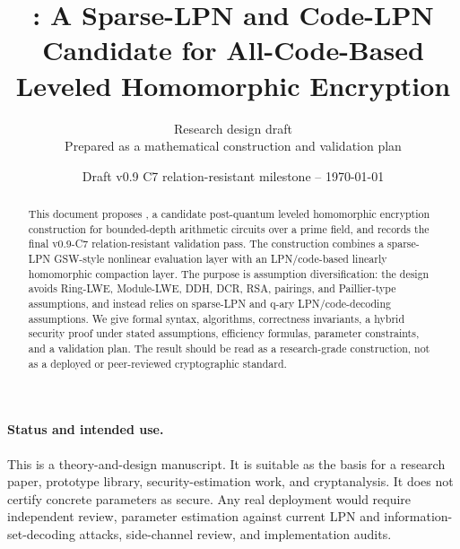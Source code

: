 \documentclass[11pt]{article}
\title{\sable: A Sparse-LPN and Code-LPN Candidate for All-Code-Based Leveled Homomorphic Encryption}
\author{Research design draft\\Prepared as a mathematical construction and validation plan}
\date{Draft v0.9 C7 relation-resistant milestone -- \today}
\begin{document}
\maketitle

\begin{abstract}
This document proposes \sable, a candidate post-quantum leveled homomorphic encryption construction for bounded-depth arithmetic circuits over a prime field, and records the final v0.9-C7 relation-resistant validation pass.  The construction combines a sparse-LPN GSW-style nonlinear evaluation layer with an LPN/code-based linearly homomorphic compaction layer.  The purpose is assumption diversification: the design avoids Ring-LWE, Module-LWE, DDH, DCR, RSA, pairings, and Paillier-type assumptions, and instead relies on sparse-LPN and q-ary LPN/code-decoding assumptions.  We give formal syntax, algorithms, correctness invariants, a hybrid security proof under stated assumptions, efficiency formulas, parameter constraints, and a validation plan.  The result should be read as a research-grade \candidate{} construction, not as a deployed or peer-reviewed cryptographic standard.
\end{abstract}

\paragraph{Status and intended use.}
This is a theory-and-design manuscript.  It is suitable as the basis for a research paper, prototype library, security-estimation work, and cryptanalysis.  It does not certify concrete parameters as secure.  Any real deployment would require independent review, parameter estimation against current LPN and information-set-decoding attacks, side-channel review, and implementation audits.

\tableofcontents












\appendix














\end{document}
